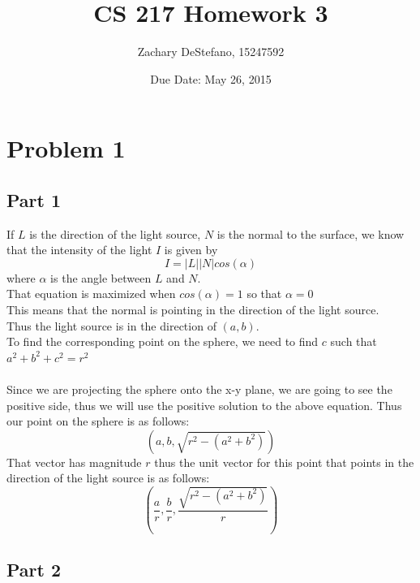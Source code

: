 \documentclass[11pt,psfig]{article}
\begin{document}
\setlength{\parskip}{1.2ex plus0.3ex minus 0.3ex}


\thispagestyle{empty} \pagestyle{myheadings} 



\title{CS 217 Homework 3}
\author{Zachary DeStefano, 15247592}
\date{Due Date: May 26, 2015}

\maketitle

\vfill\eject

\newpage

\section*{Problem 1}

\subsection*{Part 1}

If $L$ is the direction of the light source, $N$ is the normal to the surface, we know that the intensity of the light $I$ is given by
\[
I = |L| |N| cos(\alpha)
\]
where $\alpha$ is the angle between $L$ and $N$.\\
That equation is maximized when $cos(\alpha)=1$ so that $\alpha=0$\\
This means that the normal is pointing in the direction of the light source. \\
Thus the light source is in the direction of $(a,b)$.\\
To find the corresponding point on the sphere, we need to find $c$ such that $a^2 + b^2 + c^2 = r^2$\\
\\
Since we are projecting the sphere onto the x-y plane, we are going to see the positive side, thus we will use the positive solution to the above equation. Thus our point on the sphere is as follows:
\[
(a,b,\sqrt{r^2-(a^2+b^2)})
\]
That vector has magnitude $r$ thus the unit vector for this point that points in the direction of the light source is as follows:
\[
(\frac{a}{r},\frac{b}{r},\frac{\sqrt{r^2-(a^2+b^2)}}{r})
\]

\newpage

\subsection*{Part 2}
\end{document}
